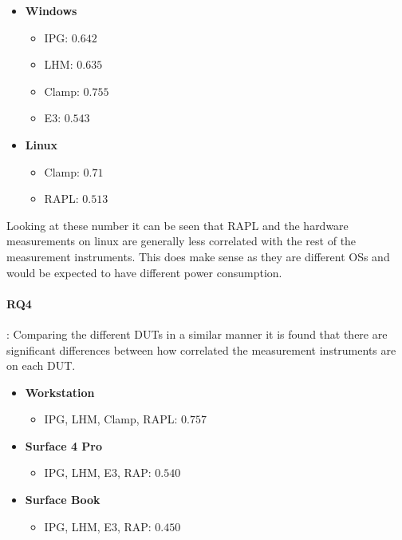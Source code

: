 \begin{itemize}
    \item \textbf{Windows}
    \begin{itemize}
        \item IPG: $0.642$ %
        \item LHM: $0.635$ %
        \item Clamp: $0.755$ %
        \item E3: $0.543$ %
    \end{itemize}
    \item \textbf{Linux}
    \begin{itemize}
        \item Clamp: $0.71$ %
        \item RAPL: $0.513$ %
    \end{itemize}
\end{itemize}

Looking at these number it can be seen that RAPL and the hardware measurements on linux are generally less correlated with the rest of the measurement instruments. This does make sense as they are different OSs and would be expected to have different power consumption.

\paragraph{RQ4}: Comparing the different DUTs in a similar manner it is found that there are significant differences between how correlated the measurement instruments are on each DUT.

\begin{itemize}
    \item \textbf{Workstation}
    \begin{itemize}
        \item IPG, LHM, Clamp, RAPL: $0.757$%
    \end{itemize}
    \item \textbf{Surface 4 Pro}
    \begin{itemize}
        \item IPG, LHM, E3, RAP: $0.540$%
    \end{itemize}
    \item \textbf{Surface Book}
    \begin{itemize}
        \item IPG, LHM, E3, RAP: $0.450$ %
    \end{itemize}
\end{itemize}

